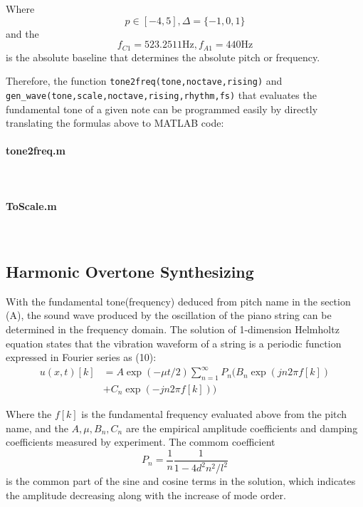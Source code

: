 \documentclass[conference]{IEEEtran}
\begin{document}
Where
\begin{equation}
	p\in[-4,5],\Delta =\{-1,0,1\}
\end{equation}
and the
\begin{equation}
	f_{C1}=523.2511 \text{Hz}, f_{A1}=440\text{Hz}
\end{equation}
is the absolute baseline that determines the absolute pitch or frequency.

Therefore, the function \lstinline{tone2freq(tone,noctave,rising)} and \lstinline{gen_wave(tone,scale,noctave,rising,rhythm,fs)} that evaluates the fundamental tone of a given note can be programmed easily by directly translating the formulas above to MATLAB code:

\paragraph{tone2freq.m}~{}



\paragraph{ToScale.m}~{}



\subsection{Harmonic Overtone Synthesizing}
With the fundamental tone(frequency) deduced from pitch name in the section (A), the sound wave produced by the oscillation of the piano string can be determined in the frequency domain. The solution of 1-dimension Helmholtz equation states that the vibration waveform of a string is a periodic function expressed in Fourier series as (10):
\begin{equation}
	\begin{aligned}
		u(x,t)[k] & =A\exp(-\mu t/2)\sum_{n=1}^{\infty} P_{n}(B_{n}\exp(j n 2 \pi f[k]) \\
		          & +C_{n}\exp(-j n 2 \pi f[k]))
	\end{aligned}
\end{equation}

Where the \(f[k]\) is the fundamental frequency evaluated above from the pitch name, and the \(A,\mu ,B_{n},C_{n}\) are the empirical amplitude coefficients and damping coefficients measured by experiment. The commom coefficient
\begin{equation}
	P_{n}=\frac{1}{n}\frac{1}{1-4d^2n^2/l^2}
\end{equation}
is the common part of the sine and cosine terms in the solution, which indicates the amplitude decreasing along with the increase of mode order.
\end{document}
